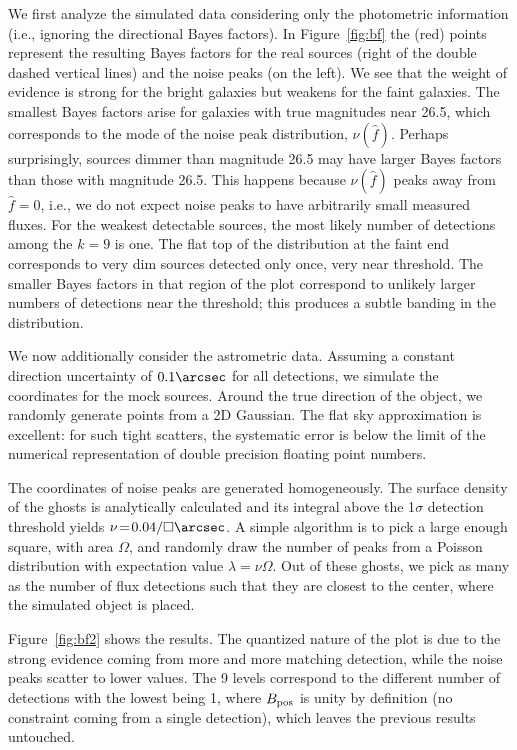 \documentclass[twocolumn]{emulateapj}
\newcommand{\flux}{f}
\newcommand{\fest}{\hat{\flux}}  %
\newcommand{\npd}{\nu}  %
\begin{document}
We first analyze the simulated data considering only the photometric information (i.e., ignoring the directional Bayes factors).
In Figure~\ref{fig:bf} the (red) points represent the resulting Bayes factors for the real sources (right of the double dashed vertical lines) and the noise peaks (on the left).
%
We see that the weight of evidence is strong for the bright galaxies but weakens for the faint galaxies.
The smallest Bayes factors arise for galaxies with true magnitudes near 26.5, which corresponds to the mode of the noise peak distribution, $\npd(\fest)$.
Perhaps surprisingly, sources dimmer than magnitude 26.5 may have larger Bayes factors than those with magnitude 26.5.
This happens because $\npd(\fest)$ peaks away from $\fest=0$, i.e., we do not expect noise peaks to have arbitrarily small measured fluxes.
For the weakest detectable sources, the most likely number of detections among the $k=9$ is one.
The flat top of the distribution at the faint end corresponds to very dim sources detected only once, very near threshold.
The smaller Bayes factors in that region of the plot correspond to unlikely larger numbers of detections near the threshold; this produces a subtle banding in the distribution.

\color{red}
We now additionally consider the astrometric data.
Assuming a constant direction  uncertainty of $0.1\arcsec$ for all detections, we simulate the coordinates for the mock sources. Around the true direction of the object, we randomly generate points from a 2D Gaussian. The flat sky approximation is excellent: for such tight scatters, the systematic error is below the limit of the numerical representation of double precision floating point numbers.

The coordinates of noise peaks are generated homogeneously.
%
The surface density of the ghosts is analytically calculated and its integral above the 1$\sigma$ detection threshold yields \mbox{$\nu\!=\!0.04/\square\arcsec$}.
%
A simple algorithm is to pick a large enough square, with area $\Omega$, and randomly draw the number of peaks from a Poisson distribution with expectation value $\lambda=\nu\Omega$. Out of these ghosts, we pick as many as the number of flux detections such that they are closest to the center, where the simulated object is placed.

Figure~\ref{fig:bf2} shows the results. The quantized nature of the plot is due to the strong evidence coming from more and more matching detection, while the noise peaks scatter to lower values. The 9 levels correspond to the different number of detections with the lowest being 1, where $B_{\rm{}pos}$ is unity by definition (no constraint coming from a single detection), which leaves the previous results untouched.
\end{document}
